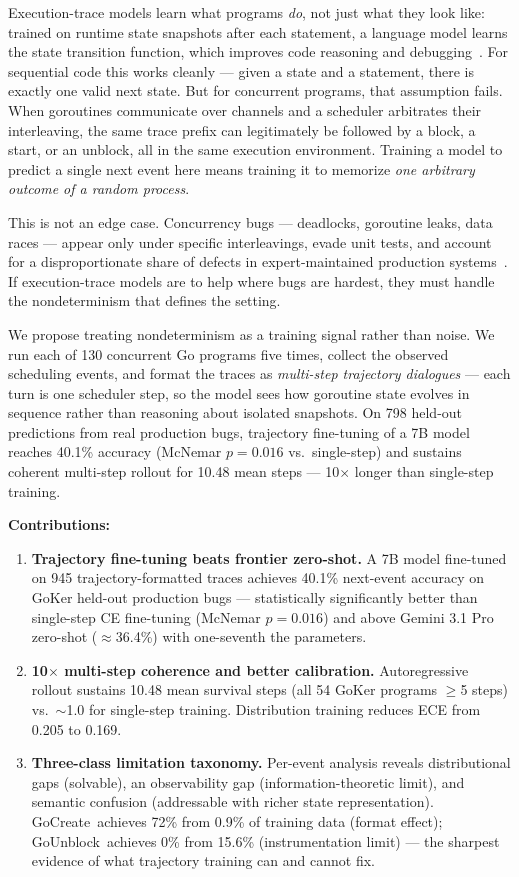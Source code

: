 \documentclass[10pt,conference]{IEEEtran}
\newcommand{\punblock}{\textsf{GoUnblock}}
\newcommand{\pcreate}{\textsf{GoCreate}}
\begin{document}
Execution-trace models learn what programs \textit{do}, not just what
they look like: trained on runtime state snapshots after each statement,
a language model learns the state transition function, which improves
code reasoning and debugging~\cite{cwm,exectuning,codeexec}.
For sequential code this works cleanly — given a state and a statement,
there is exactly one valid next state.
But for concurrent programs, that assumption fails.
When goroutines communicate over channels and a scheduler arbitrates
their interleaving, the same trace prefix can legitimately be followed
by a block, a start, or an unblock, all in the same execution
environment.
Training a model to predict a single next event here means training it
to memorize \textit{one arbitrary outcome of a random process}.

This is not an edge case.
Concurrency bugs — deadlocks, goroutine leaks, data races — appear only
under specific interleavings, evade unit tests, and account for a
disproportionate share of defects in expert-maintained production
systems~\cite{goker}.
If execution-trace models are to help where bugs are hardest, they must
handle the nondeterminism that defines the setting.

We propose treating nondeterminism as a training signal rather than
noise.
We run each of 130 concurrent Go programs five times, collect the
observed scheduling events, and format the traces as
\textit{multi-step trajectory dialogues} — each turn is one scheduler
step, so the model sees how goroutine state evolves in sequence rather
than reasoning about isolated snapshots.
On 798 held-out predictions from real production bugs, trajectory
fine-tuning of a 7B model reaches 40.1\% accuracy (McNemar
$p{=}0.016$ vs.\ single-step) and sustains coherent multi-step rollout
for 10.48 mean steps — 10$\times$ longer than single-step training.

\textbf{Contributions:}
\begin{enumerate}
\item \textbf{Trajectory fine-tuning beats frontier zero-shot.}
  A 7B model fine-tuned on 945 trajectory-formatted traces achieves
  40.1\% next-event accuracy on GoKer held-out production bugs —
  statistically significantly better than single-step CE fine-tuning
  (McNemar $p{=}0.016$) and above Gemini 3.1 Pro zero-shot
  ($\approx$36.4\%) with one-seventh the parameters.

\item \textbf{10$\times$ multi-step coherence and better calibration.}
  Autoregressive rollout sustains 10.48 mean survival steps (all 54
  GoKer programs $\geq$5 steps) vs.\ $\sim$1.0 for single-step
  training. Distribution training reduces ECE from 0.205 to 0.169.

\item \textbf{Three-class limitation taxonomy.}
  Per-event analysis reveals distributional gaps (solvable),
  an observability gap (information-theoretic limit), and semantic
  confusion (addressable with richer state representation).
  \pcreate\ achieves 72\% from 0.9\% of training data (format effect);
  \punblock\ achieves 0\% from 15.6\% (instrumentation limit) —
  the sharpest evidence of what trajectory training can and cannot fix.
\end{enumerate}
\end{document}
